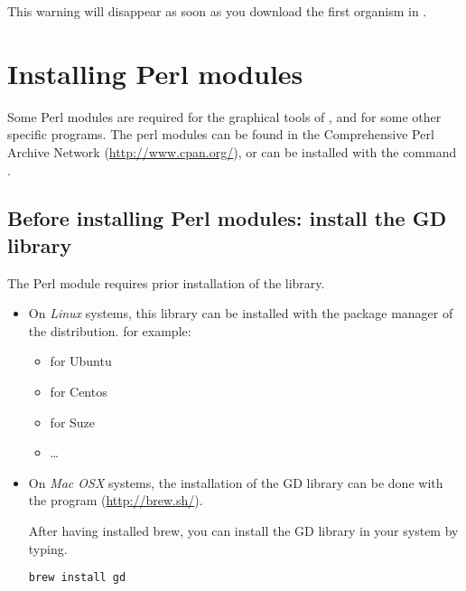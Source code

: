 \documentclass[12pt,a4paper, oneside]{scrreprt} %
\begin{document}
This warning will disappear as soon as you download the first organism
in \RSAT.


\chapter{Installing Perl modules}
\label{chap:perl_modules}

Some Perl modules are required for the graphical tools of \RSAT, and
for some other specific programs. The perl modules can be found in the
Comprehensive Perl Archive Network (\url{http://www.cpan.org/}), or
can be installed with the command .

\section{Before installing Perl modules: install the GD library}

The Perl module  requires prior installation of the
 library.

\begin{itemize}

\item On \emph{Linux} systems, this library can be installed with the
  package manager of the distribution. for example:
  \begin{itemize}
  \item {} for Ubuntu
  \item  {} for Centos
  \item {} for Suze
  \item \ldots
  \end{itemize}
  
\item On \emph{Mac OSX} systems, the installation of the GD library
  can be done with the program  (\url{http://brew.sh/}).

  After having installed brew, you can install the GD library in your
  system by typing.
  \begin{lstlisting}
brew install gd
\end{lstlisting}
   
  



\end{itemize}
\end{document}
